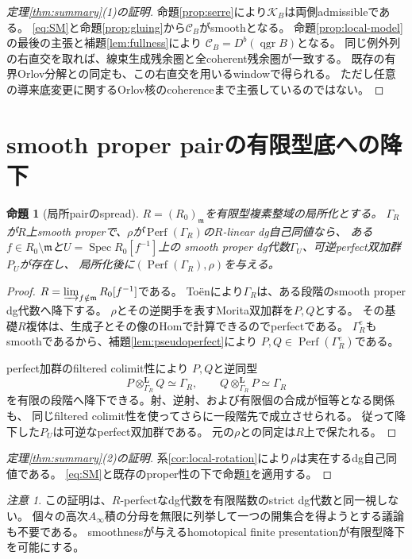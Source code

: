 \documentclass[a4paper,10pt]{ltjsarticle}
\newtheorem{proposition}[theorem]{命題}
\theoremstyle{definition}
\theoremstyle{remark}
\newtheorem{remark}[theorem]{注意}
\newcommand{\Perf}{\operatorname{Perf}}
\newcommand{\qgr}{\operatorname{qgr}}
\newcommand{\cC}{\mathcal C}
\newcommand{\cK}{\mathcal K}
\newcommand{\otL}{\otimes^{\mathbf L}}
\begin{document}
\begin{proof}[定理\ref{thm:summary}(1)の証明]
命題\ref{prop:serre}により$\cK_B$は両側admissibleである。
\eqref{eq:SM}と命題\ref{prop:gluing}から$\cC_B$がsmoothとなる。
命題\ref{prop:local-model}の最後の主張と補題\ref{lem:fullness}により
$\cC_B=D^b(\qgr B)$となる。
同じ例外列の右直交を取れば、線束生成残余圏と全coherent残余圏が一致する。
既存の有界Orlov分解との同定も、この右直交を用いるwindowで得られる。
ただし任意の導来底変更に関するOrlov核のcoherenceまで主張しているのではない。
\end{proof}

\section{smooth proper pairの有限型底への降下}\label{sec:spread}
\begin{proposition}[局所pairのspread]\label{prop:spread}
$R=(R_0)_{\mathfrak m}$を有限型複素整域の局所化とする。
$\Gamma_R$が$R$上smooth properで、$\rho$が$\Perf(\Gamma_R)$の$R$-linear dg自己同値なら、
ある$f\in R_0\setminus\mathfrak m$と$U=\operatorname{Spec}R_0[f^{-1}]$上の
smooth proper dg代数$\Gamma_U$、可逆perfect双加群$P_U$が存在し、
局所化後に$(\Perf(\Gamma_R),\rho)$を与える。
\end{proposition}
\begin{proof}
$R=\varinjlim_{f\notin\mathfrak m}R_0[f^{-1}]$である。
Toën\cite[Théorème 1]{Toen}により$\Gamma_R$は、ある段階のsmooth proper dg代数へ降下する。
$\rho$とその逆関手を表すMorita双加群を$P,Q$とする。
その基礎$R$複体は、生成子とその像のHomで計算できるのでperfectである。
$\Gamma_R^e$もsmoothであるから、補題\ref{lem:pseudoperfect}により
$P,Q\in\Perf(\Gamma_R^e)$である。

perfect加群のfiltered colimit性\cite[F4]{Toen}\cite[Lemma 2.10]{TV}により
$P,Q$と逆同型
\[
 P\otL_{\Gamma_R}Q\simeq\Gamma_R,
 \qquad Q\otL_{\Gamma_R}P\simeq\Gamma_R
\]
を有限の段階へ降下できる。射、逆射、および有限個の合成が恒等となる関係も、
同じfiltered colimit性を使ってさらに一段階先で成立させられる。
従って降下した$P_U$は可逆なperfect双加群である。
元の$\rho$との同定は$R$上で保たれる。
\end{proof}

\begin{proof}[定理\ref{thm:summary}(2)の証明]
系\ref{cor:local-rotation}により$\rho$は実在するdg自己同値である。
\eqref{eq:SM}と既存のproper性の下で命題\ref{prop:spread}を適用する。
\end{proof}

\begin{remark}
この証明は、$R$-perfectなdg代数を有限階数のstrict dg代数と同一視しない。
個々の高次$A_\infty$積の分母を無限に列挙して一つの開集合を得ようとする議論も不要である。
smoothnessが与えるhomotopical finite presentationが有限型降下を可能にする。
\end{remark}
\end{document}
